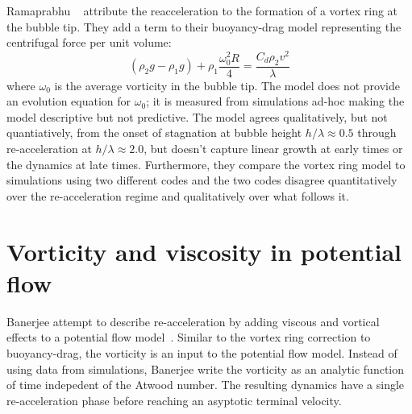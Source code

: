 Ramaprabhu \etal ~\cite{Ramaprabhu2012} attribute the reacceleration to the formation of a vortex ring at the bubble tip.
They add a term to their buoyancy-drag model representing the centrifugal force per unit volume:
\begin{equation}
\left(\rho_2 g - \rho_1 g\right) + \rho_1 \frac{\omega_0^2 R}{ 4} = \frac{C_d \rho_2 v^2}{\lambda}
\end{equation}
where $\omega_0$ is the average vorticity in the bubble tip.
The model does not provide an evolution equation for $\omega_0$; it is measured from simulations ad-hoc making the model descriptive but not predictive.
The model agrees qualitatively, but not quantiatively, from the onset of stagnation at bubble height $h / \lambda \approx 0.5$ through re-acceleration at $h/\lambda \approx 2.0$, but doesn't capture linear growth at early times or the dynamics at late times.
Furthermore, they compare the vortex ring model to simulations using two different codes and the two codes disagree quantitatively over the re-acceleration regime and qualitatively over what follows it.

\section{Vorticity and viscosity in potential flow}

Banerjee \etal attempt to describe re-acceleration by adding viscous and vortical effects to a potential flow model~\cite{Banerjee2011}.
Similar to the vortex ring correction to buoyancy-drag, the vorticity is an input to the potential flow model.
Instead of using data from simulations, Banerjee \etal write the vorticity as an analytic function of time indepedent of the Atwood number.
The resulting dynamics have a single re-acceleration phase before reaching an asyptotic terminal velocity.

